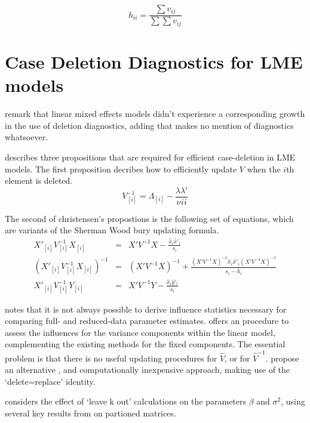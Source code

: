 \documentclass[12pt, a4paper]{report}
\theoremstyle{plain}
\theoremstyle{definition}
\theoremstyle{remark}
\begin{document}
\[ h_{ii} = \frac{\sum v_{ij}}{\sum \sum v_{ij}} \]




\section{Case Deletion Diagnostics for LME models}

\citet{HaslettDillane} remark that linear mixed effects models
didn't experience a corresponding growth in the use of deletion
diagnostics, adding that \citet{McCullSearle} makes no mention of
diagnostics whatsoever.

\citet{Christensen} describes three propositions that are required
for efficient case-deletion in LME models. The first proposition
decribes how to efficiently update $V$ when the $i$th element is
deleted.
\begin{equation}
V_{[i]}^{-1} = \Lambda_{[i]} - \frac{\lambda
	\lambda\prime}{\nu^{}ii}
\end{equation}


The second of christensen's propostions is the following set of
equations, which are variants of the Sherman Wood bury updating
formula.
\begin{eqnarray}
X'_{[i]}V_{[i]}^{-1}X_{[i]} &=& X' V^{-1}X -
\frac{\hat{x}_{i}\hat{x}'_{i}}{s_{i}}\\
(X'_{[i]}V_{[i]}^{-1}X_{[i]})^{-1} &=& (X' V^{-1}X)^{-1} +
\frac{(X' V^{-1}X)^{-1}\hat{x}_{i}\hat{x}' _{i}
	(X' V^{-1}X)^{-1}}{s_{i}- \bar{h}_{i}}\\
X'_{[i]}V_{[i]}^{-1}Y_{[i]} &=& X\prime V^{-1}Y -
\frac{\hat{x}_{i}\hat{y}' _{i}}{s_{i}}
\end{eqnarray}






% 
\citet{schabenberger} notes that it is not always possible to
derive influence statistics necessary for comparing full- and
reduced-data parameter estimates. \citet{HaslettDillane} offers an
procedure to assess the influences for the variance components
within the linear model, complementing the existing methods for
the fixed components. The essential problem is that there is no
useful updating procedures for $\hat{V}$, or for $\hat{V}^{-1}$.
\citet{HaslettDillane} propose an alternative , and
computationally inexpensive approach, making use of the
`delete=replace' identity.

\citet{Haslett99} considers the effect of `leave k out'
calculations on the parameters $\beta$ and $\sigma^{2}$, using
several key results from \citet{HaslettHayes} on partioned
matrices.
\end{document}
